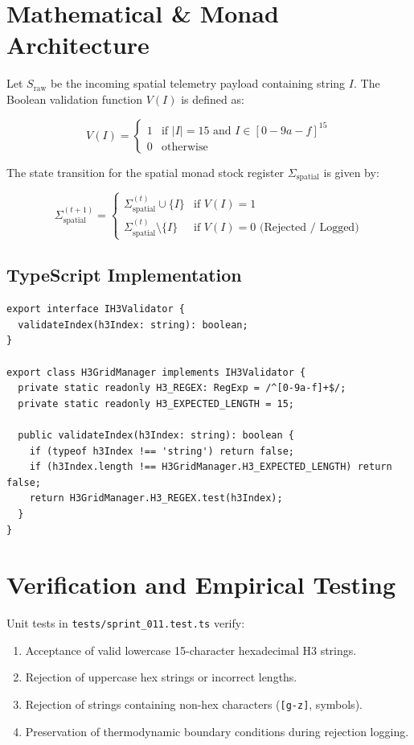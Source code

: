 \documentclass[11pt, a4paper]{article}
\begin{document}
\section{Mathematical \& Monad Architecture}
Let $S_{\text{raw}}$ be the incoming spatial telemetry payload containing string $I$. The Boolean validation function $V(I)$ is defined as:

\begin{equation}
V(I) = \begin{cases} 
1 & \text{if } |I| = 15 \text{ and } I \in [0-9a-f]^{15} \\ 
0 & \text{otherwise} 
\end{cases}
\end{equation}

The state transition for the spatial monad stock register $\Sigma_{\text{spatial}}$ is given by:

\begin{equation}
\Sigma_{\text{spatial}}^{(t+1)} = \begin{cases} 
\Sigma_{\text{spatial}}^{(t)} \cup \{I\} & \text{if } V(I) = 1 \\ 
\Sigma_{\text{spatial}}^{(t)} \setminus \{I\} & \text{if } V(I) = 0 \text{ (Rejected / Logged)} 
\end{cases}
\end{equation}

\subsection{TypeScript Implementation}
\begin{lstlisting}
export interface IH3Validator {
  validateIndex(h3Index: string): boolean;
}

export class H3GridManager implements IH3Validator {
  private static readonly H3_REGEX: RegExp = /^[0-9a-f]+$/;
  private static readonly H3_EXPECTED_LENGTH = 15;

  public validateIndex(h3Index: string): boolean {
    if (typeof h3Index !== 'string') return false;
    if (h3Index.length !== H3GridManager.H3_EXPECTED_LENGTH) return false;
    return H3GridManager.H3_REGEX.test(h3Index);
  }
}
\end{lstlisting}

\section{Verification and Empirical Testing}
Unit tests in \texttt{tests/sprint\_011.test.ts} verify:
\begin{enumerate}
    \item Acceptance of valid lowercase 15-character hexadecimal H3 strings.
    \item Rejection of uppercase hex strings or incorrect lengths.
    \item Rejection of strings containing non-hex characters (\texttt{[g-z]}, symbols).
    \item Preservation of thermodynamic boundary conditions during rejection logging.
\end{enumerate}
\end{document}
